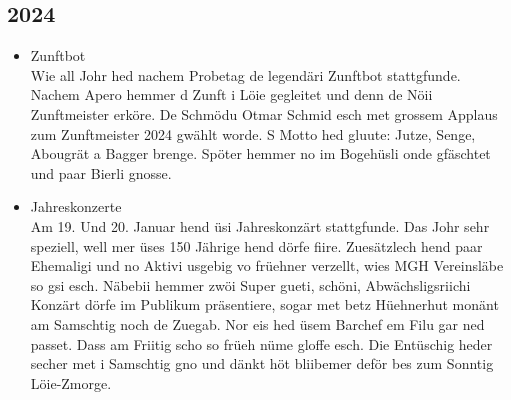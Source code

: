\subsection*{2024}
\begin{history}


    \begin{itemize}

        \item Zunftbot\\
              Wie all Johr hed nachem Probetag de legendäri Zunftbot stattgfunde.
              Nachem Apero hemmer d Zunft i Löie gegleitet und denn de Nöii Zunftmeister erköre.
              De Schmödu Otmar Schmid  esch met grossem Applaus zum Zunftmeister 2024 gwählt worde.
              S Motto hed gluute: Jutze, Senge, Abougrät a Bagger brenge.
              Spöter hemmer no im Bogehüsli onde gfäschtet und paar Bierli gnosse.


        \item Jahreskonzerte\\
              Am 19. Und 20. Januar hend üsi Jahreskonzärt stattgfunde. Das Johr sehr speziell, well mer üses 150 Jährige hend dörfe fiire. Zuesätzlech hend paar Ehemaligi und no Aktivi usgebig vo früehner verzellt, wies MGH Vereinsläbe so gsi esch.
              Näbebii hemmer zwöi Super gueti, schöni, Abwächsligsriichi Konzärt dörfe im Publikum präsentiere, sogar met betz Hüehnerhut monänt am Samschtig noch de Zuegab.
              Nor eis hed üsem Barchef em Filu gar ned passet. Dass am Friitig scho so früeh nüme gloffe esch.
              Die Entüschig heder secher met i Samschtig gno und dänkt höt bliibemer deför bes zum Sonntig Löie-Zmorge.


    \end{itemize}

\end{history}
